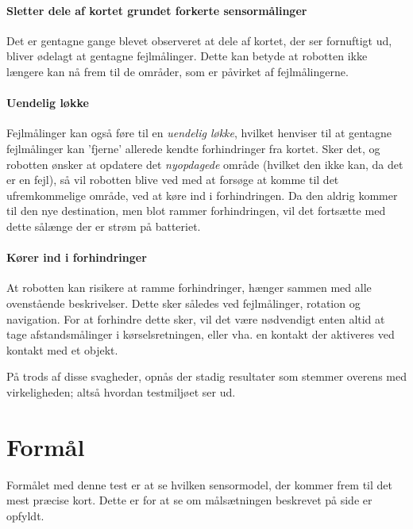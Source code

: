 \paragraph{Sletter dele af kortet grundet forkerte sensormålinger}
Det er gentagne gange blevet observeret at dele af kortet, der ser fornuftigt ud, bliver ødelagt at gentagne fejlmålinger.
Dette kan betyde at robotten ikke længere kan nå frem til de områder, som er påvirket af fejlmålingerne.

\paragraph{Uendelig løkke}
Fejlmålinger kan også føre til en \textit{uendelig løkke}, hvilket henviser til at gentagne fejlmålinger kan 'fjerne' allerede kendte forhindringer fra kortet.
Sker det, og robotten ønsker at opdatere det \textit{nyopdagede} område (hvilket den ikke kan, da det er en fejl), så vil robotten blive ved med at forsøge at komme til det ufremkommelige område, ved at køre ind i forhindringen.
Da den aldrig kommer til den nye destination, men blot rammer forhindringen, vil det fortsætte med dette sålænge der er strøm på batteriet.

\paragraph{Kører ind i forhindringer}
At robotten kan risikere at ramme forhindringer, hænger sammen med alle ovenstående beskrivelser.
Dette sker således ved fejlmålinger, rotation og navigation.
For at forhindre dette sker, vil det være nødvendigt enten altid at tage afstandsmålinger i kørselsretningen, eller vha. en kontakt der aktiveres ved kontakt med et objekt.


På trods af disse svagheder, opnås der stadig resultater som stemmer overens med virkeligheden; altså hvordan testmiljøet ser ud.

\section{Formål}
Formålet med denne test er at se hvilken sensormodel, der kommer frem til det mest præcise kort.
Dette er for at se om målsætningen beskrevet på side \pageref{problem:maalsaetning} er opfyldt.

